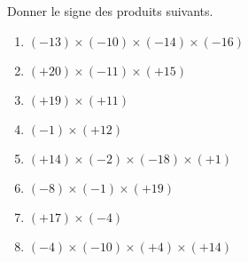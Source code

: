 \begin{exercice*}
    Donner le signe des produits suivants.
        \begin{enumerate}
            \item $ (-13) \times (-10) \times (-14) \times (-16) $
            \item $ (+20) \times (-11) \times (+15) $
            \item $ (+19) \times (+11) $
            \item $ (-1) \times (+12) $
            \item $ (+14) \times (-2) \times (-18) \times (+1) $
            \item $ (-8) \times (-1) \times (+19) $
            \item $ (+17) \times (-4) $
            \item $ (-4) \times (-10) \times (+4) \times (+14) $
        \end{enumerate}

\end{exercice*}
